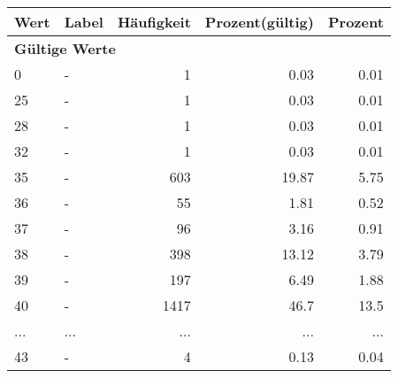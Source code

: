      \begin{longtable}{lXrrr}
     \toprule
     \textbf{Wert} & \textbf{Label} & \textbf{Häufigkeit} & \textbf{Prozent(gültig)} & \textbf{Prozent} \\
     \endhead
     \midrule
     \multicolumn{5}{l}{\textbf{Gültige Werte}}\\
        0 & \multicolumn{1}{X}{-} & %
          \num{1} &
          \num[round-mode=places,round-precision=2]{0,03} &
          \num[round-mode=places,round-precision=2]{0,01} \\
        25 & \multicolumn{1}{X}{-} & %
          \num{1} &
          \num[round-mode=places,round-precision=2]{0,03} &
          \num[round-mode=places,round-precision=2]{0,01} \\
        28 & \multicolumn{1}{X}{-} & %
          \num{1} &
          \num[round-mode=places,round-precision=2]{0,03} &
          \num[round-mode=places,round-precision=2]{0,01} \\
        32 & \multicolumn{1}{X}{-} & %
          \num{1} &
          \num[round-mode=places,round-precision=2]{0,03} &
          \num[round-mode=places,round-precision=2]{0,01} \\
        35 & \multicolumn{1}{X}{-} & %
          \num{603} &
          \num[round-mode=places,round-precision=2]{19,87} &
          \num[round-mode=places,round-precision=2]{5,75} \\
        36 & \multicolumn{1}{X}{-} & %
          \num{55} &
          \num[round-mode=places,round-precision=2]{1,81} &
          \num[round-mode=places,round-precision=2]{0,52} \\
        37 & \multicolumn{1}{X}{-} & %
          \num{96} &
          \num[round-mode=places,round-precision=2]{3,16} &
          \num[round-mode=places,round-precision=2]{0,91} \\
        38 & \multicolumn{1}{X}{-} & %
          \num{398} &
          \num[round-mode=places,round-precision=2]{13,12} &
          \num[round-mode=places,round-precision=2]{3,79} \\
        39 & \multicolumn{1}{X}{-} & %
          \num{197} &
          \num[round-mode=places,round-precision=2]{6,49} &
          \num[round-mode=places,round-precision=2]{1,88} \\
        40 & \multicolumn{1}{X}{-} & %
          \num{1417} &
          \num[round-mode=places,round-precision=2]{46,7} &
          \num[round-mode=places,round-precision=2]{13,5} \\
       ... & ... & ... & ... & ... \\
        43 & \multicolumn{1}{X}{-} & %
          \num{4} &
          \num[round-mode=places,round-precision=2]{0,13} &
          \num[round-mode=places,round-precision=2]{0,04} \\


\end{longtable}
